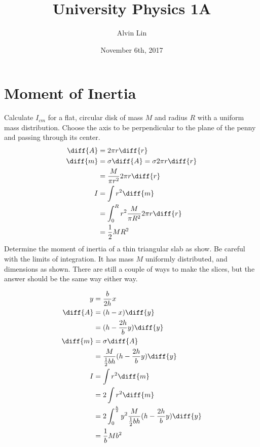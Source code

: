 \documentclass{math}
\title{University Physics 1A}
\author{Alvin Lin}
\date{November 6th, 2017}
\begin{document}
\maketitle

\section*{Moment of Inertia}
Calculate \( I_{cm} \) for a flat, circular disk of mass \( M \) and radius
\( R \) with a uniform mass distribution. Choose the axis to be perpendicular to
the plane of the penny and passing through its center.
\begin{align*}
  \diff{A} &= 2\pi r\diff{r} \\
  \diff{m} &= \sigma\diff{A} = \sigma2\pi r\diff{r} \\
  &= \frac{M}{\pi r^2}2\pi r\diff{r} \\
  I &= \int r^2\diff{m} \\
  &= \int_{0}^{R}r^2\frac{M}{\pi R^2}2\pi r\diff{r} \\
  &= \frac{1}{2}MR^2
\end{align*}
Determine the moment of inertia of a thin triangular slab as show. Be careful
with the limits of integration. It has mass \( M \) uniformly distributed, and
dimensions as shown. There are still a couple of ways to make the slices, but
the answer should be the same way either way.
\begin{center}
\end{center}
\begin{align*}
  y &= \frac{b}{2h}x \\
  \diff{A} &= (h-x)\diff{y} \\
  &= (h-\frac{2h}{b}y)\diff{y} \\
  \diff{m} &= \sigma\diff{A} \\
  &= \frac{M}{\frac{1}{2}bh}(h-\frac{2h}{b}y)\diff{y} \\
  I &= \int r^2\diff{m} \\
  &= 2\int r^2\diff{m} \\
  &= 2\int_{0}^{\frac{h}{2}}
    y^2\frac{M}{\frac{1}{2}bh}(h-\frac{2h}{b}y)\diff{y} \\
  &= \frac{1}{b}Mb^2
\end{align*}
\end{document}
